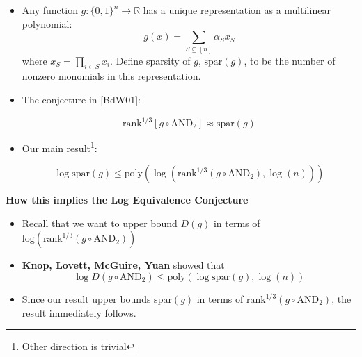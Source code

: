 \begin{frame}
	
	
	
	\begin{itemize}
		\item<1-> Any function $g: \{0,1\}^n \rightarrow \mathbb{R}$ has a unique representation as a multilinear polynomial:
		$$ g(x) = \displaystyle \sum_{S \subseteq [n]} \alpha_S x_S$$
		where $x_S= \displaystyle \prod_{i \in S} x_i$. \newline
		Define sparsity of $g$, $\text{spar}(g)$, to be the number of nonzero monomials in this representation. 
		
	\end{itemize}
	
\end{frame}


\begin{frame}{}
	
	
	
	\begin{itemize}
		\item<1-> The conjecture in [BdW01]:
		
		$$ \text{rank}^{1/3} [g \circ \text{AND}_2] \approx \text{spar}(g)$$
		\item<2-> Our main result\footnote{Other direction is trivial}:
		
		$$ \log \text{spar}(g) \leq \text{poly}\left(\log ( \text{rank}^{1/3} (g \circ \text{AND}_2), \log(n) )\right) $$ 
	\end{itemize}
	
\end{frame}

\begin{frame}
	
\textbf{How this implies the Log Equivalence Conjecture}
	
	\begin{itemize}
		\item<1-> Recall that we want to upper bound $D(g)$ in terms of $\text{log} \left( \text{rank}^{1/3} (g \circ \text{AND}_2)\right)$
		\item<2-> \textbf{Knop, Lovett, McGuire, Yuan} showed that
		$$ \log D(g \circ \text{AND}_2) \leq \text{poly}(\log \text{spar}(g), \log(n))$$
		\item<3-> Since our result upper bounds $\text{spar}(g)$ in terms of $\text{rank}^{1/3}(g \circ \text{AND}_2)$, the result immediately follows.
	\end{itemize}
	
\end{frame}


